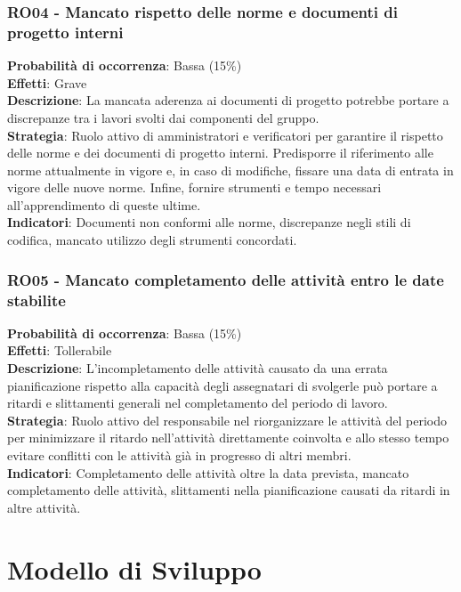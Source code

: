 \documentclass[a4paper,12pt]{article}
\begin{document}
\subsubsection{RO04 - Mancato rispetto delle norme e documenti di progetto interni}
\label{RO04}
\textbf{Probabilità di occorrenza}: Bassa (15\%)\\
\textbf{Effetti}: Grave\\
\textbf{Descrizione}: La mancata aderenza ai documenti di progetto potrebbe portare a discrepanze tra i lavori svolti dai componenti del gruppo.\\
\textbf{Strategia}: Ruolo attivo di amministratori e verificatori per garantire il rispetto delle norme e dei documenti di progetto interni. Predisporre il riferimento alle norme attualmente in vigore e, in caso di modifiche, fissare una data di entrata in vigore delle nuove norme. Infine, fornire strumenti e tempo necessari all'apprendimento di queste ultime.\\
\textbf{Indicatori}: Documenti non conformi alle norme, discrepanze negli stili di codifica, mancato utilizzo degli strumenti concordati.

\subsubsection{RO05 - Mancato completamento delle attività entro le date stabilite}
\label{RO05}
\textbf{Probabilità di occorrenza}: Bassa (15\%)\\
\textbf{Effetti}: Tollerabile\\
\textbf{Descrizione}: L'incompletamento delle attività causato da una errata pianificazione rispetto alla capacità degli assegnatari di svolgerle può portare a ritardi e slittamenti generali nel completamento del periodo di lavoro.\\
\textbf{Strategia}: Ruolo attivo del responsabile nel riorganizzare le attività del periodo per minimizzare il ritardo nell'attività direttamente coinvolta e allo stesso tempo evitare conflitti con le attività già in progresso di altri membri.\\
\textbf{Indicatori}: Completamento delle attività oltre la data prevista, mancato completamento delle attività, slittamenti nella pianificazione causati da ritardi in altre attività.

\section{Modello di Sviluppo}
\end{document}
